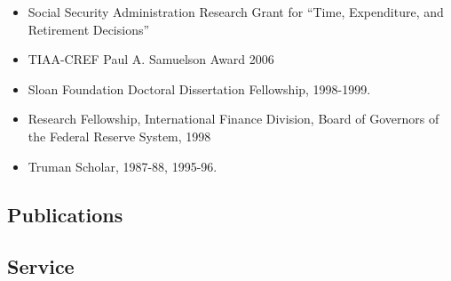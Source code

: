 \documentclass[12pt]{article}
\begin{document}
\begin{itemize}[left=0pt .. \parindent, label=]
\item Social Security Administration Research Grant for ``Time, Expenditure,
and Retirement Decisions''

\item TIAA-CREF Paul A. Samuelson Award 2006

\item Sloan Foundation Doctoral Dissertation Fellowship, 1998-1999.

\item Research Fellowship, International Finance Division, Board of Governors of the Federal Reserve System, 1998

\item Truman Scholar, 1987-88, 1995-96.

\end{itemize}
 
   
\subsection*{Publications}



    




 \subsection*{Service}
\end{document}
